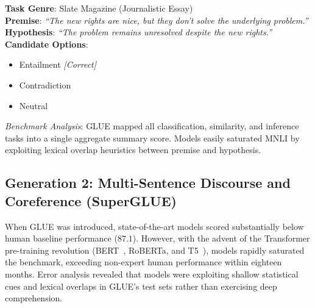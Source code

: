 \documentclass[../../main.tex]{subfiles}
\begin{document}
\begin{center}
\begin{minipage}{0.95\textwidth}
\begin{tcolorbox}[colback=cardBg,colframe=cardLine,arc=2pt,boxrule=0.5pt,title=\textbf{GLUE Benchmark Example: Multi-Genre Natural Language Inference (MNLI)}]
\small\sffamily
\textbf{Task Genre}: Slate Magazine (Journalistic Essay) \\
\textbf{Premise}: \textit{``The new rights are nice, but they don't solve the underlying problem.''} \\
\textbf{Hypothesis}: \textit{``The problem remains unresolved despite the new rights.''} \\
\textbf{Candidate Options}:
\begin{itemize}[leftmargin=1.5em,itemsep=1pt]
    \item[\textbf{(A)}] Entailment \hfill \textit{[Correct]}
    \item[\textbf{(B)}] Contradiction
    \item[\textbf{(C)}] Neutral
\end{itemize}
\textit{Benchmark Analysis}: GLUE mapped all classification, similarity, and inference tasks into a single aggregate summary score. Models easily saturated MNLI by exploiting lexical overlap heuristics between premise and hypothesis.
\end{tcolorbox}
\end{minipage}
\end{center}

\subsection{Generation 2: Multi-Sentence Discourse and Coreference (SuperGLUE)}
\label{subsec:glue_superglue}

When GLUE was introduced, state-of-the-art models scored substantially below human baseline performance ($87.1$). However, with the advent of the Transformer pre-training revolution (BERT~\cite{devlin2019}, RoBERTa, and T5~\cite{raffel2020t5}), models rapidly saturated the benchmark, exceeding non-expert human performance within eighteen months. Error analysis revealed that models were exploiting shallow statistical cues and lexical overlaps in GLUE's test sets rather than exercising deep comprehension.
\end{document}
